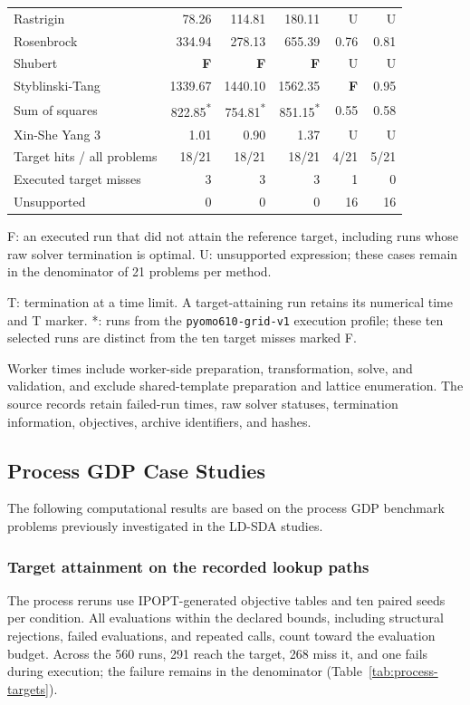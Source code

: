 \documentclass{article}
\begin{document}
\begin{table}[htbp]
\begin{tabular}{@{}lrrrrr@{}}
Rastrigin & 78.26 & 114.81 & 180.11 & U & U \\
Rosenbrock & 334.94 & 278.13 & 655.39 & 0.76 & 0.81 \\
Shubert & \textbf{F} & \textbf{F} & \textbf{F} & U & U \\
Styblinski-Tang & 1339.67 & 1440.10 & 1562.35 & \textbf{F} & 0.95 \\
Sum of squares & 822.85\textsuperscript{*} & 754.81\textsuperscript{*} & 851.15\textsuperscript{*} & 0.55 & 0.58 \\
Xin-She Yang 3 & 1.01 & 0.90 & 1.37 & U & U \\
\midrule
Target hits / all problems & 18/21 & 18/21 & 18/21 & 4/21 & 5/21 \\
Executed target misses & 3 & 3 & 3 & 1 & 0 \\
Unsupported & 0 & 0 & 0 & 16 & 16 \\
\bottomrule
\end{tabular}
\par\vspace{5pt}
\begin{minipage}{\linewidth}
\footnotesize
F: an executed run that did not attain the reference target, including runs whose raw solver termination is optimal. U: unsupported expression; these cases remain in the denominator of 21 problems per method.\par
T: termination at a time limit. A target-attaining run retains its numerical time and T marker. *: runs from the \texttt{pyomo610-grid-v1} execution profile; these ten selected runs are distinct from the ten target misses marked F.\par
Worker times include worker-side preparation, transformation, solve, and validation, and exclude shared-template preparation and lattice enumeration. The source records retain failed-run times, raw solver statuses, termination information, objectives, archive identifiers, and hashes.\par
\end{minipage}
\end{table}
\FloatBarrier

\subsection{Process GDP Case Studies}
\label{sec:process-results}
The following computational results are based on the process GDP benchmark problems previously investigated in the LD-SDA studies.

\subsubsection{Target attainment on the recorded lookup paths}
The process reruns use IPOPT-generated objective tables and ten paired seeds per condition. All evaluations within the declared bounds, including structural rejections, failed evaluations, and repeated calls, count toward the evaluation budget.
Across the 560 runs, 291 reach the target, 268 miss it, and one fails during execution; the failure remains in the denominator (Table~\ref{tab:process-targets}).
\end{document}
